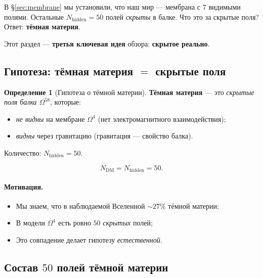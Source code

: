 \documentclass[11pt,a4paper]{article}
\newcommand{\Om}{\Omega^4}
\newcommand{\Omfi}{\Omega^{58}}
\newcommand{\Nhidden}{N_{\text{hidden}}}
\theoremstyle{definition}
\newtheorem{definition}[theorem]{Определение}
\begin{document}
В §\ref{sec:membrane} мы установили, что наш мир — мембрана 
с $7$ видимыми полями. Остальные $\Nhidden = 50$ полей 
\emph{скрыты} в балке. Что это за скрытые поля? 
Ответ: \textbf{тёмная материя}.

Этот раздел — \textbf{третья ключевая идея} обзора: 
\textbf{скрытое реально}.

\subsection{Гипотеза: тёмная материя $=$ скрытые поля}
\label{subsec:dm-hypothesis}

\begin{definition}[Гипотеза о тёмной материи]
\label{def:dm-hypothesis}
\textbf{Тёмная материя} — это \emph{скрытые поля балка $\Omfi$}, 
которые:
\begin{itemize}
    \item \emph{не видны} на мембране $\Om$ (нет электромагнитного 
          взаимодействия);
    \item \emph{видны} через гравитацию (гравитация — свойство 
          балка).
\end{itemize}
Количество: $\Nhidden = 50$.
\end{definition}

\begin{equation}
    \boxed{
    N_{\text{DM}} = \Nhidden = 50.
    }
    \label{eq:dm-count}
\end{equation}

\paragraph{Мотивация.}
\begin{itemize}
    \item Мы знаем, что в наблюдаемой Вселенной 
          $\sim 27\%$ тёмной материи;
    \item В модели $\Om$ есть ровно $50$ \emph{скрытых} полей;
    \item Это совпадение делает гипотезу \emph{естественной}.
\end{itemize}

\subsection{Состав $50$ полей тёмной материи}
\label{subsec:dm-content}
\end{document}
